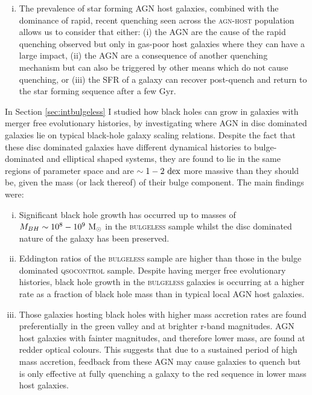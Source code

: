 {\begin{enumerate}[(i)]
\item The prevalence of star forming AGN host galaxies, combined with the dominance of rapid, recent quenching seen across the \textsc{agn-host} population allows us to consider that either: (i)  the AGN are the cause of the rapid quenching observed but only in gas-poor host galaxies where they can have a large impact, (ii) the AGN are a consequence of another quenching mechanism but can also be triggered by other means which do not cause quenching, or (iii) the SFR of a galaxy can recover post-quench and return to the star forming sequence after a few Gyr.

\end{enumerate}

In Section \ref{sec:intbulgeless} I studied how black holes can grow in galaxies with merger free evolutionary histories, by investigating where AGN in disc dominated galaxies lie on typical black-hole galaxy scaling relations. Despite the fact that these disc dominated galaxies have different dynamical histories to bulge-dominated and elliptical shaped systems, they are found to lie in the same regions of parameter space and are $\sim1-2~\rm{dex}$ more massive than they should be, given the mass (or lack thereof) of their bulge component. The main findings were:
\begin{enumerate}[(i)]
\item Significant black hole growth has occurred up to masses of $M_{BH}\sim10^8 - 10^9~\rm{M}_{\odot}$ in the \textsc{bulgeless} sample whilst the disc dominated nature of the galaxy has been preserved.

\item Eddington ratios of the \textsc{bulgeless} sample are higher than those in the bulge dominated \textsc{qsocontrol} sample. Despite having merger free evolutionary histories, black hole growth in the \textsc{bulgeless} galaxies is occurring at a higher rate as a fraction of black hole mass than in typical local AGN host galaxies. 

\item Those galaxies hosting black holes with higher mass accretion rates are found preferentially in the green valley and at brighter r-band magnitudes. AGN host galaxies with fainter magnitudes, and therefore lower mass, are found at redder optical colours. This suggests that due to a sustained period of high mass accretion, feedback from these AGN may cause galaxies to quench but is only effective at fully quenching a galaxy to the red sequence in lower mass host galaxies.


\end{enumerate}}
